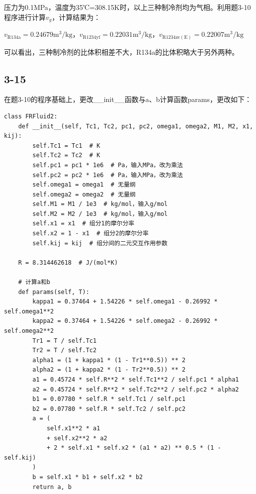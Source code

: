 \documentclass[12pt,a4paper]{article}
\begin{document}
压力为0.1MPa，温度为35℃=308.15K时，以上三种制冷剂均为气相。利用题3-10程序进行计算$v_g$，计算结果为：

$v_\mathrm{R134a}=0.24679\mathrm{m^3/kg}$，$v_\mathrm{R1234yf}=0.22031\mathrm{m^3/kg}$，$v_\mathrm{R1234ze(E)}=0.22007\mathrm{m^3/kg}$

可以看出，三种制冷剂的比体积相差不大，R134a的比体积略大于另外两种。

\subsection*{3-15}
在题3-10的程序基础上，更改\_\_init\_\_函数与a、b计算函数params，更改如下：
\begin{lstlisting}
class FRFluid2:
    def __init__(self, Tc1, Tc2, pc1, pc2, omega1, omega2, M1, M2, x1, kij):
        self.Tc1 = Tc1  # K
        self.Tc2 = Tc2  # K
        self.pc1 = pc1 * 1e6  # Pa，输入MPa，改为乘法
        self.pc2 = pc2 * 1e6  # Pa，输入MPa，改为乘法
        self.omega1 = omega1  # 无量纲
        self.omega2 = omega2  # 无量纲
        self.M1 = M1 / 1e3  # kg/mol，输入g/mol
        self.M2 = M2 / 1e3  # kg/mol，输入g/mol
        self.x1 = x1  # 组分1的摩尔分率
        self.x2 = 1 - x1  # 组分2的摩尔分率
        self.kij = kij  # 组分间的二元交互作用参数

    R = 8.314462618  # J/(mol*K)

    # 计算a和b
    def params(self, T):
        kappa1 = 0.37464 + 1.54226 * self.omega1 - 0.26992 * self.omega1**2
        kappa2 = 0.37464 + 1.54226 * self.omega2 - 0.26992 * self.omega2**2
        Tr1 = T / self.Tc1
        Tr2 = T / self.Tc2
        alpha1 = (1 + kappa1 * (1 - Tr1**0.5)) ** 2
        alpha2 = (1 + kappa2 * (1 - Tr2**0.5)) ** 2
        a1 = 0.45724 * self.R**2 * self.Tc1**2 / self.pc1 * alpha1
        a2 = 0.45724 * self.R**2 * self.Tc2**2 / self.pc2 * alpha2
        b1 = 0.07780 * self.R * self.Tc1 / self.pc1
        b2 = 0.07780 * self.R * self.Tc2 / self.pc2
        a = (
            self.x1**2 * a1
            + self.x2**2 * a2
            + 2 * self.x1 * self.x2 * (a1 * a2) ** 0.5 * (1 - self.kij)
        )
        b = self.x1 * b1 + self.x2 * b2
        return a, b

\end{lstlisting}
\end{document}
